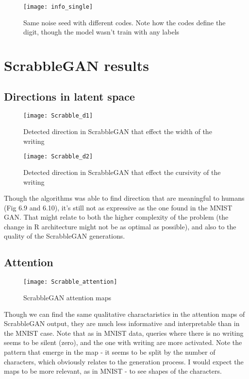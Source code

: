 \begin{figure}[h]
\centering
\texttt{[image: info\_single]}
\caption{Same noise seed with different codes. Note how the codes define the digit, though the model wasn't train with any labels}
\label{fig:x cubed graph}
\end{figure}



\section{ScrabbleGAN results}




\subsection{Directions in latent space}



\begin{figure}[h]
\centering
\texttt{[image: Scrabble\_d1]}
\caption{Detected direction in ScrabbleGAN that effect the width of the writing}
\label{fig:x cubed graph}
\end{figure}

\begin{figure}[h]
\centering
\texttt{[image: Scrabble\_d2]}
\caption{Detected direction in ScrabbleGAN that effect the cursivity of the writing}
\label{fig:x cubed graph}
\end{figure}


Though the algorithms was able to find direction that are meaningful to humans (Fig 6.9 and 6.10), it's still not as expressive as the one found in the MNIST GAN. That might relate to both the higher complexity of the problem (the change in R architecture might not be as optimal as possible), and also to the quality of the ScrabbleGAN generations.


\subsection{Attention}


\begin{figure}[h]
\centering
\texttt{[image: Scrabble\_attention]}
\caption{ScrabbleGAN attention maps}
\label{fig:x cubed graph}
\end{figure}


Though we can find the same qualitative charactaristics in the attention maps of ScrabbleGAN output, they are much less informative and interpretable than in the MNIST case.
Note that as in MNIST data, queries where there is no writing seems to be silent (zero), and the one with writing are more activated.
Note the pattern that emerge in the map - it seems to be split by the number of characters, which obviously relates to the generation process. I would expect the maps to be more relevant, as in MNIST - to see shapes of the characters.


